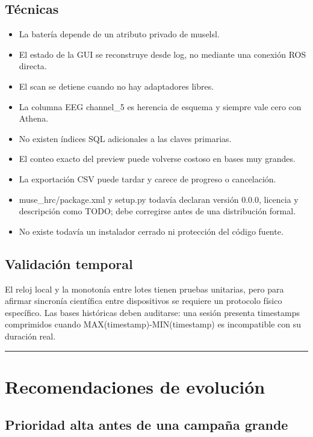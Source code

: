 \documentclass[11pt,a4paper]{article}
\begin{document}
\subsection{Técnicas}

\begin{itemize}
\item La batería depende de un atributo privado de {\ttfamily\small muselsl}.
\item El estado de la GUI se reconstruye desde log, no mediante una conexión ROS directa.
\item El scan se detiene cuando no hay adaptadores libres.
\item La columna EEG {\ttfamily\small channel\_5} es herencia de esquema y siempre vale cero con Athena.
\item No existen índices SQL adicionales a las claves primarias.
\item El conteo exacto del preview puede volverse costoso en bases muy grandes.
\item La exportación CSV puede tardar y carece de progreso o cancelación.
\item {\ttfamily\small muse\_hrc/package.xml} y {\ttfamily\small setup.py} todavía declaran versión {\ttfamily\small 0.0.0}, licencia y
descripción como {\ttfamily\small TODO}; debe corregirse antes de una distribución formal.

\item No existe todavía un instalador cerrado ni protección del código fuente.
\end{itemize}

\subsection{Validación temporal}

El reloj local y la monotonía entre lotes tienen pruebas unitarias, pero para afirmar sincronía científica entre dispositivos se requiere un protocolo físico específico. Las bases históricas deben auditarse: una sesión presenta timestamps comprimidos cuando {\ttfamily\small MAX(timestamp)-MIN(timestamp)} es incompatible con su duración real.

\medskip\hrule\medskip

\section{Recomendaciones de evolución}

\subsection{Prioridad alta antes de una campaña grande}
\end{document}

